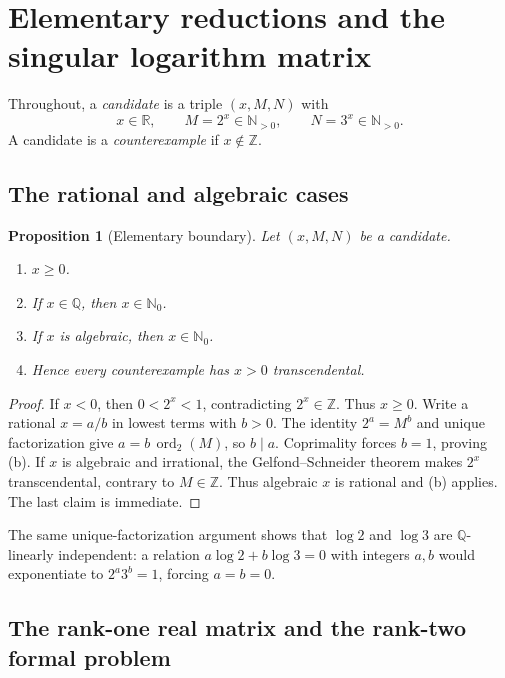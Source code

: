 \documentclass[11pt]{article}
\newtheorem{proposition}[theorem]{Proposition}
\theoremstyle{definition}
\theoremstyle{remark}
\newcommand{\Q}{\mathbb{Q}}
\newcommand{\Z}{\mathbb{Z}}
\newcommand{\R}{\mathbb{R}}
\newcommand{\Nzero}{\mathbb{N}_{0}}
\newcommand{\Npos}{\mathbb{N}_{>0}}
\newcommand{\ord}{\operatorname{ord}}
\begin{document}
\section{Elementary reductions and the singular logarithm matrix}
\label{sec:elementary}

Throughout, a \emph{candidate} is a triple $(x,M,N)$ with
\[
 x\in\R,\qquad M=2^x\in\Npos,\qquad N=3^x\in\Npos.
\]
A candidate is a \emph{counterexample} if $x\notin\Z$.

\subsection{The rational and algebraic cases}

\begin{proposition}[Elementary boundary]
\label{prop:elementary-boundary}
Let $(x,M,N)$ be a candidate.
\begin{enumerate}[label=\textup{(\alph*)}]
\item $x\ge 0$.
\item If $x\in\Q$, then $x\in\Nzero$.
\item If $x$ is algebraic, then $x\in\Nzero$.
\item Hence every counterexample has $x>0$ transcendental.
\end{enumerate}
\end{proposition}

\begin{proof}
If $x<0$, then $0<2^x<1$, contradicting $2^x\in\Z$.  Thus $x\ge0$.
Write a rational $x=a/b$ in lowest terms with $b>0$.  The identity
$2^a=M^b$ and unique factorization give $a=b\,\ord_2(M)$, so $b\mid a$.
Coprimality forces $b=1$, proving (b).  If $x$ is algebraic and irrational,
the Gelfond--Schneider theorem makes $2^x$ transcendental, contrary to
$M\in\Z$.  Thus algebraic $x$ is rational and (b) applies.  The last claim is immediate.
\end{proof}

The same unique-factorization argument shows that $\log 2$ and $\log 3$ are
$\Q$-linearly independent: a relation $a\log2+b\log3=0$ with integers $a,b$
would exponentiate to $2^a3^b=1$, forcing $a=b=0$.

\subsection{The rank-one real matrix and the rank-two formal problem}
\end{document}
